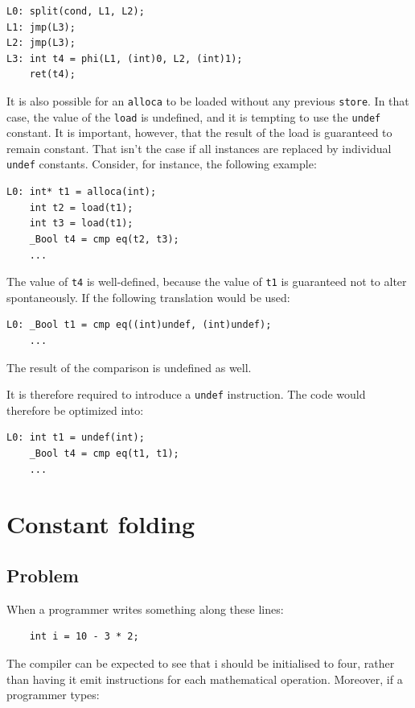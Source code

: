 \documentclass[12pt, a4paper]{article}
\begin{document}
\begin{lstlisting}
L0:	split(cond, L1, L2);
L1:	jmp(L3);
L2:	jmp(L3);
L3:	int t4 = phi(L1, (int)0, L2, (int)1);
	ret(t4);
\end{lstlisting}

It is also possible for an \verb+alloca+ to be loaded without any previous 
\verb+store+. In that case, the value of the \verb+load+ is undefined, and it is 
tempting to use the \verb+undef+ constant. It is important, however, that the 
result of the load is guaranteed to remain constant. That isn't the case if all 
instances are replaced by individual \verb+undef+ constants. Consider, for 
instance, the following example:

\begin{lstlisting}
L0:	int* t1 = alloca(int);
	int t2 = load(t1);
	int t3 = load(t1);
	_Bool t4 = cmp eq(t2, t3);
	...
\end{lstlisting}

The value of \verb+t4+ is well-defined, because the value of \verb+t1+ is
guaranteed not to alter spontaneously. If the following translation would be 
used:

\begin{lstlisting}
L0:	_Bool t1 = cmp eq((int)undef, (int)undef);
	...
\end{lstlisting}

The result of the comparison is undefined as well.

It is therefore required to introduce a \verb+undef+ instruction. The code would 
therefore be
optimized into:

\begin{lstlisting}
L0:	int t1 = undef(int);
	_Bool t4 = cmp eq(t1, t1);
	...
\end{lstlisting}


\section{Constant folding}
\label{sec:cfld}
\subsection{Problem}
When a programmer writes something along these lines:

\begin{lstlisting}
	int i = 10 - 3 * 2;
\end{lstlisting}

The compiler can be expected to see that i should be initialised to four, rather 
than having it emit instructions for each mathematical operation. Moreover, if a 
programmer types:
\end{document}
